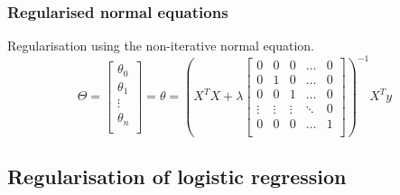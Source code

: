 \documentclass{article}
\begin{document}
\subsubsection{Regularised normal equations}
Regularisation using the non-iterative normal equation.
\color{blue}
\begin{equation}
\Theta = 
\begin{bmatrix} 
\theta_0\\ 
\theta_1 \\
\vdots \\
\theta_n\\
\end{bmatrix} = 
\theta = \left( X^TX + \lambda 
\begin{bmatrix}
0 & 0 & 0 & \hdots & 0 \\
0 & 1 & 0 & \hdots & 0 \\
0 & 0 & 1 & \hdots & 0 \\
\vdots & \vdots & \vdots & \ddots & 0 \\
0 & 0 & 0 & \hdots & 1 \\
\end{bmatrix}
 \right)^{-1} X^Ty
\end{equation}
\color{black}

\subsection{Regularisation of logistic regression}
\end{document}
